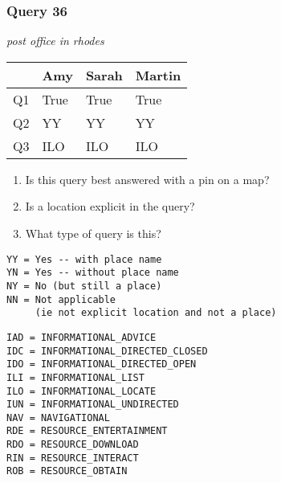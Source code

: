\begin{frame}[fragile]
\frametitle{Query 36}
\vspace{1em}

\emph{post office in rhodes}

\vfill

\begin{table}
  \centering
  \begin{tabular}{ l l l l }
    & \textbf{Amy} & \textbf{Sarah} & \textbf{Martin}\\
    \toprule
    Q1 & True & True & True\\
Q2 & YY & YY & YY\\
Q3 & ILO & ILO & ILO\\
    \bottomrule
  \end{tabular}
\end{table}

\vfill

\tiny{

\begin{enumerate}
\item Is this query best answered with a pin on a map?
\item Is a location explicit in the query?
\item What type of query is this?
\end{enumerate}

\vfill

\begin{multicols}{2}
\begin{verbatim}
YY = Yes -- with place name
YN = Yes -- without place name
NY = No (but still a place)
NN = Not applicable 
     (ie not explicit location and not a place)
\end{verbatim}

\columnbreak
\begin{verbatim}
IAD = INFORMATIONAL_ADVICE
IDC = INFORMATIONAL_DIRECTED_CLOSED
IDO = INFORMATIONAL_DIRECTED_OPEN
ILI = INFORMATIONAL_LIST
ILO = INFORMATIONAL_LOCATE
IUN = INFORMATIONAL_UNDIRECTED
NAV = NAVIGATIONAL
RDE = RESOURCE_ENTERTAINMENT
RDO = RESOURCE_DOWNLOAD
RIN = RESOURCE_INTERACT
ROB = RESOURCE_OBTAIN
\end{verbatim}
\end{multicols}
}

\end{frame}


